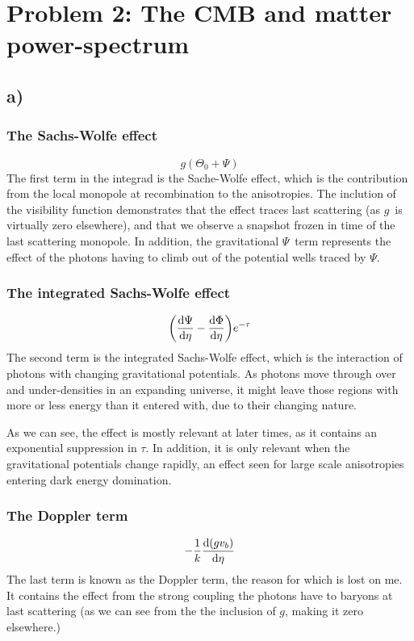 \documentclass[10pt, a4paper]{article}
\renewcommand{\exp}{e^}
\renewcommand{\exp}{e^}
\begin{document}
% 
% 




\section*{Problem 2: The CMB and matter power-spectrum}
\subsection*{a)}
\subsubsection*{The Sachs-Wolfe effect}
\begin{equation}
    g(\Theta_0 + \Psi)
\end{equation}
The first term in the integrad is the Sache-Wolfe effect, which is the contribution from the local monopole at recombination to the anisotropies. The inclution of the visibility function demonstrates that the effect traces last scattering (as $g$ is virtually zero elsewhere), and that we observe a snapshot frozen in time of the last scattering monopole. In addition, the gravitational $\Psi$ term represents the effect of the photons having to climb out of the potential wells traced by $\Psi$.


\subsubsection*{The integrated Sachs-Wolfe effect}
\begin{equation}
    \qty(\dv{\Psi}{\eta} - \dv{\Phi}{\eta})\exp{-\tau}
\end{equation}
The second term is the integrated Sachs-Wolfe effect, which is the interaction of photons with changing gravitational potentials. As photons move through over and under-densities in an expanding universe, it might leave those regions with more or less energy than it entered with, due to their changing nature.

As we can see, the effect is mostly relevant at later times, as it contains an exponential suppression in $\tau$. In addition, it is only relevant when the gravitational potentials change rapidly, an effect seen for large scale anisotropies entering dark energy domination.


\subsubsection*{The Doppler term}
\begin{equation}
    -\frac{1}{k}\dv{(g v_b)}{\eta}
\end{equation}
The last term is known as the Doppler term, the reason for which is lost on me. It contains the effect from the strong coupling the photons have to baryons at last scattering (as we can see from the the inclusion of $g$, making it zero elsewhere.)
\end{document}
